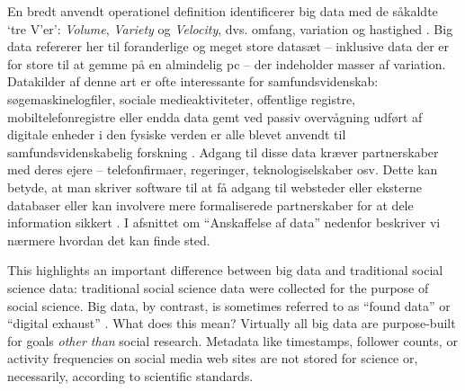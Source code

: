 \documentclass[12pt,]{article}
\begin{document}
En bredt anvendt operationel definition identificerer big data med de
såkaldte `tre V'er': \emph{Volume}, \emph{Variety} og \emph{Velocity},
dvs. omfang, variation og hastighed \citep{laney01}. Big data refererer
her til foranderlige og meget store datasæt -- inklusive data der er for
store til at gemme på en almindelig pc -- der indeholder masser af
variation. Datakilder af denne art er ofte interessante for
samfundsvidenskab: søgemaskinelogfiler, sociale medieaktiviteter,
offentlige registre, mobiltelefonregistre eller endda data gemt ved
passiv overvågning udført af digitale enheder i den fysiske verden er
alle blevet anvendt til samfundsvidenskabelig forskning
\citep{salganik17}. Adgang til disse data kræver partnerskaber med deres
ejere -- telefonfirmaer, regeringer, teknologiselskaber osv. Dette kan
betyde, at man skriver software til at få adgang til websteder eller
eksterne databaser eller kan involvere mere formaliserede partnerskaber
for at dele information sikkert \citep{EL14}. I afsnittet om
``Anskaffelse af data'' nedenfor beskriver vi nærmere hvordan det kan
finde sted.

This highlights an important difference between big data and traditional
social science data: traditional social science data were collected for
the purpose of social science. Big data, by contrast, is sometimes
referred to as ``found data'' or ``digital exhaust'' \citep{harford14}.
What does this mean? Virtually all big data are purpose-built for goals
\emph{other than} social research. Metadata like timestamps, follower
counts, or activity frequencies on social media web sites are not stored
for science or, necessarily, according to scientific standards.
\end{document}
